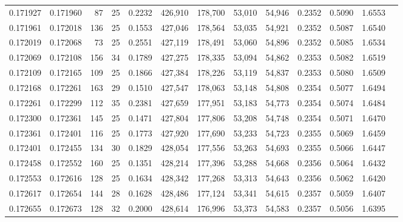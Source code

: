 \begin{tabular}{rrrrrrrrrrrrr}
0.171927 & 0.171960 &  87 &  25 &                                     0.2232 & 426,910 & 178,700 &  53,010 &  54,946 & 0.2352 & 0.5090 & 1.6553 \\
0.171961 & 0.172018 & 136 &  25 &                                     0.1553 & 427,046 & 178,564 &  53,035 &  54,921 & 0.2352 & 0.5087 & 1.6540 \\
0.172019 & 0.172068 &  73 &  25 &                                     0.2551 & 427,119 & 178,491 &  53,060 &  54,896 & 0.2352 & 0.5085 & 1.6534 \\
0.172069 & 0.172108 & 156 &  34 &                                     0.1789 & 427,275 & 178,335 &  53,094 &  54,862 & 0.2353 & 0.5082 & 1.6519 \\
0.172109 & 0.172165 & 109 &  25 &                                     0.1866 & 427,384 & 178,226 &  53,119 &  54,837 & 0.2353 & 0.5080 & 1.6509 \\
0.172168 & 0.172261 & 163 &  29 &                                     0.1510 & 427,547 & 178,063 &  53,148 &  54,808 & 0.2354 & 0.5077 & 1.6494 \\
0.172261 & 0.172299 & 112 &  35 &                                     0.2381 & 427,659 & 177,951 &  53,183 &  54,773 & 0.2354 & 0.5074 & 1.6484 \\
0.172300 & 0.172361 & 145 &  25 &                                     0.1471 & 427,804 & 177,806 &  53,208 &  54,748 & 0.2354 & 0.5071 & 1.6470 \\
0.172361 & 0.172401 & 116 &  25 &                                     0.1773 & 427,920 & 177,690 &  53,233 &  54,723 & 0.2355 & 0.5069 & 1.6459 \\
0.172401 & 0.172455 & 134 &  30 &                                     0.1829 & 428,054 & 177,556 &  53,263 &  54,693 & 0.2355 & 0.5066 & 1.6447 \\
0.172458 & 0.172552 & 160 &  25 &                                     0.1351 & 428,214 & 177,396 &  53,288 &  54,668 & 0.2356 & 0.5064 & 1.6432 \\
0.172553 & 0.172616 & 128 &  25 &                                     0.1634 & 428,342 & 177,268 &  53,313 &  54,643 & 0.2356 & 0.5062 & 1.6420 \\
0.172617 & 0.172654 & 144 &  28 &                                     0.1628 & 428,486 & 177,124 &  53,341 &  54,615 & 0.2357 & 0.5059 & 1.6407 \\
0.172655 & 0.172673 & 128 &  32 &                                     0.2000 & 428,614 & 176,996 &  53,373 &  54,583 & 0.2357 & 0.5056 & 1.6395 \\

\end{tabular}
